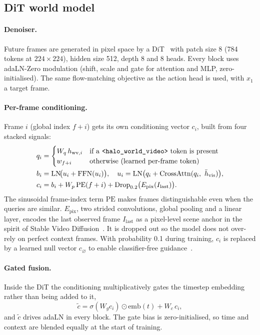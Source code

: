 \documentclass[11pt]{article}
\newcommand{\tok}[1]{\texttt{<#1>}}
\begin{document}
\subsection{DiT world model}
\label{sec:dit}

\paragraph{Denoiser.} Future frames are generated in pixel space by a DiT~\cite{peebles2023dit}
with patch size 8 (784 tokens at $224\times224$), hidden size 512, depth 8 and 8 heads.
Every block uses adaLN-Zero modulation (shift, scale and gate for attention and MLP,
zero-initialised). The same flow-matching objective as the action head is used, with
$x_1$ a target frame.

\paragraph{Per-frame conditioning.} Frame $i$ (global index $f+i$) gets its own conditioning
vector $c_i$, built from four stacked signals:
\begin{align}
  q_i &= \begin{cases} W_q\,h_{\text{wv},i} & \text{if a \tok{halo\_world\_video} token is present}\\ w_{f+i} & \text{otherwise (learned per-frame token)}\end{cases}\\
  b_i &= \mathrm{LN}\!\big(u_i + \mathrm{FFN}(u_i)\big),\quad u_i=\mathrm{LN}\big(q_i+\mathrm{CrossAttn}(q_i,\ \bar h_{\text{vis}})\big),\\
  c_i &= b_i + W_p\,\mathrm{PE}(f+i) + \mathrm{Drop}_{0.2}\big(E_{\text{pix}}(I_{\text{last}})\big).
\end{align}
The sinusoidal frame-index term $\mathrm{PE}$ makes frames distinguishable even when the
queries are similar. $E_{\text{pix}}$, two strided convolutions, global pooling and a linear
layer, encodes the last observed frame $I_{\text{last}}$ as a pixel-level scene anchor in
the spirit of Stable Video Diffusion~\cite{blattmann2023svd}. It is dropped out so the model
does not over-rely on perfect context frames. With probability 0.1 during training, $c_i$
is replaced by a learned null vector $c_\varnothing$ to enable classifier-free
guidance~\cite{ho2022cfg}.

\paragraph{Gated fusion.} Inside the DiT the conditioning multiplicatively gates the timestep
embedding rather than being added to it,
\begin{equation}
  \tilde c = \sigma(W_g c_i)\odot \mathrm{emb}(t) + W_c\,c_i ,
\end{equation}
and $\tilde c$ drives adaLN in every block. The gate bias is zero-initialised, so time and
context are blended equally at the start of training.
\end{document}
